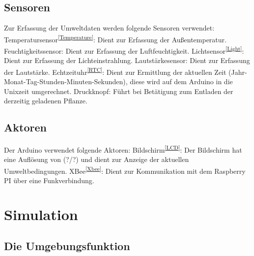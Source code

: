 \documentclass{article}
\begin{document}
\subsection{Sensoren}
Zur Erfassung der Umweltdaten werden folgende Sensoren verwendet: \newline
Temperatursensor\textsuperscript{\ref{Temperature}}: 
Dient zur Erfassung der Außentemperatur.\newline
Feuchtigkeitssensor: 
Dient zur Erfassung der Luftfeuchtigkeit.\newline
Lichtsensor\textsuperscript{\ref{Light}}: 
Dient zur Erfassung der Lichteinstrahlung.\newline
Lautstärkesensor: 
Dient zur Erfassung der Lautstärke. \newline
Echtzeituhr\textsuperscript{\ref{RTC}}: 
Dient zur Ermittlung der aktuellen Zeit (Jahr-Monat-Tag-Stunden-Minuten-Sekunden), 
diese wird auf dem Arduino in die Unixzeit umgerechnet.\newline
Druckknopf: 
Führt bei Betätigung zum Entladen der derzeitig geladenen Pflanze.\newline
\subsection{Aktoren}
Der Arduino verwendet folgende Aktoren: \newline
Bildschirm\textsuperscript{\ref{LCD}}: 
Der Bildschirm hat eine Auflösung von (?/?) und dient zur Anzeige der aktuellen Umweltbedingungen.\newline
XBee\textsuperscript{\ref{Xbee}}: 
Dient zur Kommunikation mit dem Raspberry PI über eine Funkverbindung.
\newpage

\section{Simulation}

\subsection{Die Umgebungsfunktion}
\end{document}

